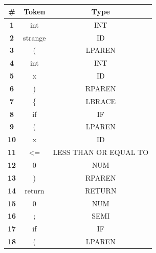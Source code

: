\documentclass{article}
\begin{document}
\subsection{}
\begin{latin}
\begin{longtable}[c]{|c|c|c|}
\hline
\textbf{\#} & \textbf{Token}          & \textbf{Type}         \\ \hline
\textbf{1}  & int                     & INT                   \\ \hline
\textbf{2}  & strange                 & ID                    \\ \hline
\textbf{3}  & (                       & LPAREN                \\ \hline
\textbf{4}  & int                     & INT                   \\ \hline
\textbf{5}  & x                       & ID                    \\ \hline
\textbf{6}  & )                       & RPAREN                \\ \hline
\textbf{7}  & \{  & LBRACE                \\ \hline
\textbf{8}  & if                      & IF                    \\ \hline
\textbf{9}  & (                       & LPAREN                \\ \hline
\textbf{10} & x                       & ID                    \\ \hline
\textbf{11} & \textless{}=            & LESS THAN OR EQUAL TO \\ \hline
\textbf{12} & 0                       & NUM                   \\ \hline
\textbf{13} & )                       & RPAREN                \\ \hline
\textbf{14} & return                  & RETURN                \\ \hline
\textbf{15} & 0                       & NUM                   \\ \hline
\textbf{16} & ;                       & SEMI                  \\ \hline
\textbf{17} & if                      & IF                    \\ \hline
\textbf{18} & (                       & LPAREN                \\ \hline

\end{longtable}
\end{latin}
\end{document}
